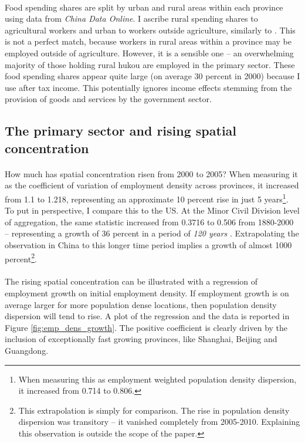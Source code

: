 \documentclass[]{article}
\theoremstyle{plain}
\begin{document}
\paragraph*{}
Food spending shares are split by urban and rural areas within each province using data from \textit{China Data Online}. I ascribe rural spending shares to agricultural workers and urban to workers outside agriculture, similarly to \cite{hao2020}. This is not a perfect match, because workers in rural areas within a province may be employed outside of agriculture. However, it is a sensible one -- an overwhelming majority of those holding rural hukou are employed in the primary sector. These food spending shares appear quite large (on average 30 percent in 2000) because I use after tax income. This potentially ignores income effects stemming from the provision of goods and services by the government sector.  

\subsection*{The primary sector and rising spatial concentration}
\paragraph*{}
How much has spatial concentration risen from 2000 to 2005? When measuring it as the coefficient of variation of employment density across provinces, it increased from 1.1 to 1.218, representing an approximate 10 percent rise in just 5 years\footnote{When measuring this as employment weighted population density dispersion, it increased from 0.714 to 0.806.}. To put in perspective, I compare this to the US. At the Minor Civil Division level of aggregation, the same statistic increased from 0.3716 to 0.506 from 1880-2000 -- representing a growth of 36 percent in a period of \textit{120 years} \citep{urbstruct}. Extrapolating the observation in China to this longer time period implies a growth of almost 1000 percent\footnote{This extrapolation is simply for comparison. The rise in population density dispersion was transitory -- it vanished completely from 2005-2010. Explaining this observation is outside the scope of the paper.}. 

\paragraph*{}
The rising spatial concentration can be illustrated with a regression of employment growth on initial employment density. If employment growth is on average larger for more population dense locations, then population density dispersion will tend to rise. A plot of the regression and the data is reported in Figure \ref{fig:emp_dens_growth}. The positive coefficient is clearly driven by the inclusion of exceptionally fast growing provinces, like Shanghai, Beijing and Guangdong. 
\end{document}
